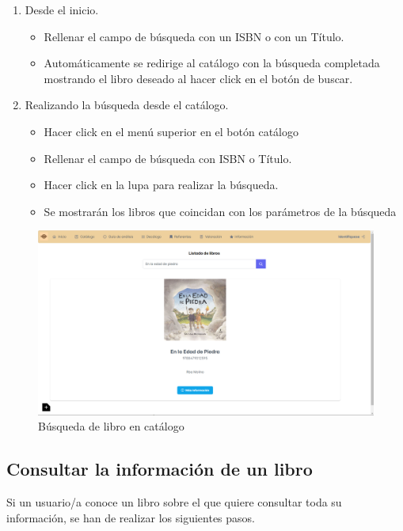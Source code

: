 \begin{enumerate}
    \item Desde el inicio.
    \begin{itemize}
        \item Rellenar el campo de búsqueda con un ISBN o con un Título.
        \item Automáticamente se redirige al catálogo con la búsqueda completada mostrando el libro deseado al hacer click en el botón de buscar.
    \end{itemize}
    \item Realizando la búsqueda desde el catálogo.
    \begin{itemize}
        \item Hacer click en el menú superior en el botón catálogo
        \item Rellenar el campo de búsqueda con ISBN o Título.
        \item Hacer click en la lupa para realizar la búsqueda.
        \item Se mostrarán los libros que coincidan con los parámetros de la búsqueda
    \end{itemize}
\end{enumerate}


\begin{figure}[h]
    \centering
    \includegraphics[width=1\linewidth]{Imagenes/ManualBusquedaLibro.png}
    \caption{Búsqueda de libro en catálogo}
    \label{Búsuqeda de libro en catálogo}
\end{figure}
\FloatBarrier

\subsection{Consultar la información de un libro}
Si un usuario/a conoce un libro sobre el que quiere consultar toda su información, se han de realizar los siguientes pasos. 

